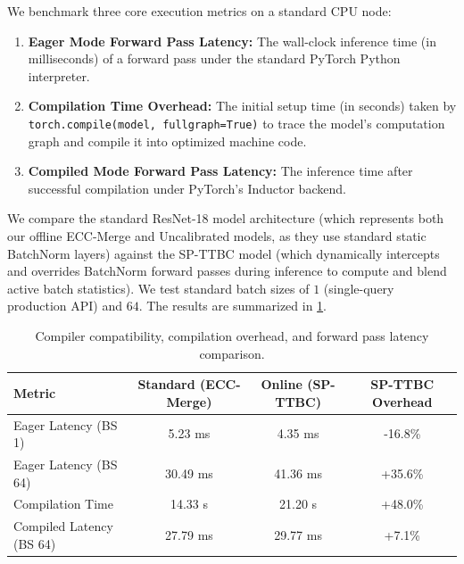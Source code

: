 \documentclass{article}
\theoremstyle{plain}
\theoremstyle{definition}
\theoremstyle{remark}
\begin{document}
We benchmark three core execution metrics on a standard CPU node:
\begin{enumerate}
    \item \textbf{Eager Mode Forward Pass Latency:} The wall-clock inference time (in milliseconds) of a forward pass under the standard PyTorch Python interpreter.
    \item \textbf{Compilation Time Overhead:} The initial setup time (in seconds) taken by \texttt{torch.compile(model, fullgraph=True)} to trace the model's computation graph and compile it into optimized machine code.
    \item \textbf{Compiled Mode Forward Pass Latency:} The inference time after successful compilation under PyTorch's Inductor backend.
\end{enumerate}

We compare the standard ResNet-18 model architecture (which represents both our offline ECC-Merge and Uncalibrated models, as they use standard static BatchNorm layers) against the SP-TTBC model (which dynamically intercepts and overrides BatchNorm forward passes during inference to compute and blend active batch statistics). We test standard batch sizes of $1$ (single-query production API) and $64$. The results are summarized in \cref{tab:compiler_benchmark}.

\begin{table}[h]
\caption{Compiler compatibility, compilation overhead, and forward pass latency comparison.}
\label{tab:compiler_benchmark}
\vskip 0.15in
\begin{center}
\begin{small}
\begin{sc}
\begin{tabular}{lccc}
\toprule
Metric & Standard (ECC-Merge) & Online (SP-TTBC) & SP-TTBC Overhead \\
\midrule
Eager Latency (BS 1) & 5.23 ms & 4.35 ms & -16.8\% \\
Eager Latency (BS 64) & 30.49 ms & 41.36 ms & +35.6\% \\
Compilation Time & 14.33 s & 21.20 s & +48.0\% \\
Compiled Latency (BS 64) & 27.79 ms & 29.77 ms & +7.1\% \\
\bottomrule
\end{tabular}
\end{sc}
\end{small}
\end{center}
\vskip -0.1in
\end{table}
\end{document}
